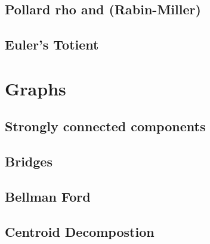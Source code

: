 \documentclass[12pt]{extarticle}
\begin{document}
\begin{multicols*}{2}
\subsection{Pollard rho and (Rabin-Miller)} %


\subsection{Euler's Totient} %


\section{Graphs}

\subsection{Strongly connected components} %


\subsection{Bridges} %


\subsection{Bellman Ford}


% 

% 

% 

\subsection{Centroid Decompostion}



\end{multicols*}
\end{document}
